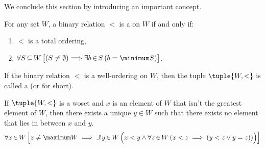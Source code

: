 \noindent
We conclude this section by introducing an important concept.
\begin{dfn}
    \label{dfn:well-ordering}
    For any set \( W \), a binary relation \( < \) is a  on \( W \) if and only if:
    \begin{enumerate}[topsep=2pt,label=\texttt{\textup{(\alph*)}}]
        \item \( < \) is a total ordering,
        \item \( \forall S \,{\subseteq}\, W \, \big[ \mleft( S \neq \emptyset \mright) {\implies}
                \exists b\,{\in}\,S \, \mleft( b = \minimum S \mright) \big] \).
    \end{enumerate}
\end{dfn}

\begin{dfn}[Woset]
    \label{dfn:woset}
    If the binary relation \( < \) is a well-ordering on \( W \), then the tuple \( \tuple{W, <} \) is
    called a  (or  for short).
\end{dfn}

\begin{thm}
    \label{thm:every-element-of-a-woset-as-long-as-it-is-not-the-greatest-element-has-a-unique-successor}
    If \( \tuple{W, <} \) is a woset and \( x \) is an element of \( W \) that isn't the greatest element of \( W \),
    then there exists a unique \( y \in W \) such that there exists no element that lies in between \( x \) and \( y \).
    \begin{equation*}
        \forall x\,{\in}\,W \, \Big[ x \neq \maximum W
        \implies
        \exists! y\,{\in}\,W \, \Big( x < y \land \forall z\,{\in}\,W \, \mleft( x < z \implies \mleft( y < z \lor y = z \mright) \mright) \Big)  \Big]
    \end{equation*}
\end{thm}

